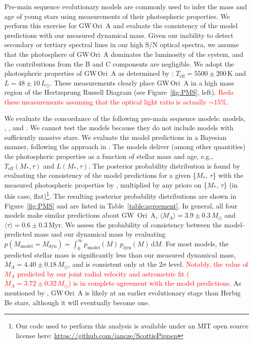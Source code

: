 \documentclass[twocolumn]{aastex61}
\newcommand{\todo}[1]{ \textcolor{red}{#1}}
\newcommand{\gw}{GW\,Ori}
\begin{document}



Pre-main sequence evolutionary models are commonly used to infer the mass and age of young stars using measurements of their photospheric properties. We perform this exercise for \gw~A and evaluate the consistency of the model predictions with our measured dynamical mass. Given our inability to detect secondary or tertiary spectral lines in our high S/N optical spectra, we assume that the photosphere of \gw~A dominates the luminosity of the system, and the contributions from the B and C components are negligible. We adopt the photospheric properties of \gw~A as determined by \citet{fang14}: $T_\mathrm{eff} = 5500 \pm 200\,\mathrm{K}$ and $L = 48 \pm 10\,L_\odot$. These measurements clearly place \gw~A in a high mass region of the Hertzsprung Russell Diagram (see Figure~\ref{fig:PMS}, left). \todo{Redo these measurements assuming that the optical light ratio is actually $\sim 15\%$.}

We evaluate the concordance of the following pre-main sequence models: \citet{choi16} models, \citet{dotter08}, \citet{tognelli11}, and \citet{siess00}. We cannot test the \citet{baraffe15} models because they do not include models with sufficiently massive stars. We evaluate the model predictions in a Bayesian manner, following the approach in \citet{jorgensen05,rosenfeld12b,czekala15a}. The models deliver (among other quantities) the photospheric properties as a function of stellar mass and age,
e.g., $T_\mathrm{eff}(M_\ast, \tau)$ and $L(M_\ast, \tau)$.
The posterior probability distribution is found by evaluating the consistency of the model predictions for a given \{$M_\ast$, $\tau$\} with the measured photospheric properties by \citet{fang14}, multiplied by any priors on  \{$M_\ast$, $\tau$\} (in this case, flat)\footnote{Our code used to perform this analysis is available under an MIT open source license here: \url{https://github.com/iancze/ScottiePippen}}.
The resulting posterior probability distributions are shown in Figure~\ref{fig:PMS} and are listed in Table~\ref{table:agreement}. In general, all four models make similar predictions about GW~Ori~A, $\langle M_A \rangle = 3.9 \pm 0.3\,M_\odot$ and $\langle \tau \rangle = 0.6 \pm 0.3\,$Myr. We assess the probability of consistency between the model-predicted mass and our dynamical mass by evaluating $p(M_\mathrm{model} = M_\mathrm{dyn}) = \int_0^\infty p_\mathrm{model}(M) \, p_\mathrm{dyn}(M) \, \mathrm{d}M$. For most models, the predicted stellar mass is significantly less than our measured dynamical mass, $M_A = 4.40 \pm 0.18\,M_\odot$, and is consistent only at the $2\sigma$ level. \todo{Notably, the value of $M_A$ predicted by our joint radial velocity and astrometric fit ($M_A = 3.72 \pm 0.32\,M_\odot$) is in complete agreement with the model predictions.} As mentioned by \citet{fang14}, \gw~A is likely at an earlier evolutionary stage than Herbig Be stars, although it will eventually become one.
\end{document}
